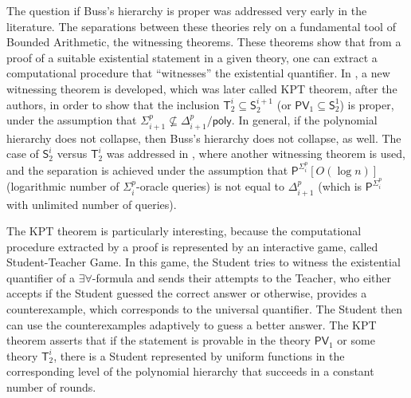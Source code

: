 \documentclass[11pt]{article}
\newcommand{\poly}{\mathsf{poly}}
\renewcommand{\P}{\mathsf{P}}
\newcommand{\PV}{\mathsf{PV}}
\theoremstyle{definition}
\theoremstyle{definition}
\theoremstyle{remark}
\begin{document}
The question if Buss's hierarchy is proper was addressed very early in the literature. The separations between these theories rely on a fundamental tool of Bounded Arithmetic, the witnessing theorems. These theorems show that from a proof of a suitable existential statement in a given theory, one can extract a computational procedure that ``witnesses'' the existential quantifier. In \cite{KrajicekPT91}, a new witnessing theorem is developed, which was later called KPT theorem, after the authors, in order to show that the inclusion $\mathsf{T}^{i}_2 \subseteq\mathsf{S}^{i+1}_2$ (or $\PV_1 \subseteq\mathsf{S}^{1}_2$) is proper, under the assumption that $\Sigma^p_{i+1}\not\subseteq \Delta^p_{i+1}/\poly$. In general, if the polynomial hierarchy does not collapse, then Buss's hierarchy does not collapse, as well. The case of $\mathsf{S}^i_2$ versus $\mathsf{T}^i_2$ was addressed in \cite{krajivcek1993fragments}, where another witnessing theorem is used, and the separation is achieved under the assumption that $\P^{\Sigma^p_i}[O(\log n)]$ (logarithmic number of $\Sigma^p_i$-oracle queries) is not equal to $\Delta^p_{i+1}$ (which is $\P^{\Sigma^p_i}$ with unlimited number of queries).

The KPT theorem is particularly interesting, because the computational procedure extracted by a proof is represented by an interactive game, called Student-Teacher Game. In this game, the Student tries to witness the existential quantifier of a $\exists\forall$-formula and sends their attempts to the Teacher, who either accepts if the Student guessed the correct answer or otherwise, provides a counterexample, which corresponds to the universal quantifier. The Student then can use the counterexamples adaptively to guess a better answer. The KPT theorem asserts that if the statement is provable in the theory $\PV_1$ or some theory $\mathsf{T}^i_2$, there is a Student represented by uniform functions in the corresponding level of the polynomial hierarchy that succeeds in a constant number of rounds. 
\end{document}
